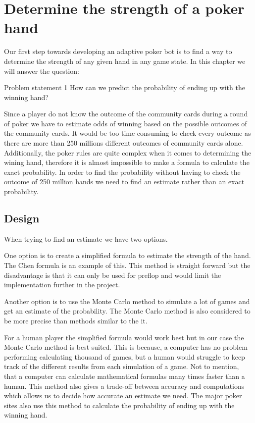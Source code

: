\section{Determine the strength of a poker hand}
\label{sec:part1}
Our first step towards developing an adaptive poker bot is to find a way to determine the strength of any given hand in any game state. In this chapter we will answer the question: 

\vspace{4mm}
\begin{statementBox2}{Problem statement 1}
How can we predict the probability of ending up with the winning hand?
\end{statementBox2}
\vspace{4mm}

Since a player do not know the outcome of the community cards during a round of poker we have to estimate odds of winning based on the possible outcomes of the community cards. It would be too time consuming to check every outcome as there are more than 250 millions different outcomes of community cards alone. Additionally, the poker rules are quite complex when it comes to determining the wining hand, therefore it is almost impossible to make a formula to calculate the exact probability. In order to find the probability without having to check the outcome of 250 million hands we need to find an estimate rather than an exact probability. 

\subsection{Design}
When trying to find an estimate we have two options.

One option is to create a simplified formula to estimate the strength of the hand. The Chen formula is an example of this. This method is straight forward but the disadvantage is that it can only be used for preflop and would limit the implementation further in the project.

Another option is to use the Monte Carlo method to simulate a lot of games and get an estimate of the probability. The Monte Carlo method is also considered to be more precise than methods similar to the it. 

For a human player the simplified formula would work best but in our case the Monte Carlo method is best suited. This is because, a computer has no problem performing calculating thousand of games, but a human would struggle to keep track of the different results from each simulation of a game. Not to mention, that a computer can calculate mathematical formulas many times faster than a human. This method also gives a trade-off between accuracy and computations which allows us to decide how accurate an estimate we need. The major poker sites also use this method to calculate the probability of ending up with the winning hand.\\

